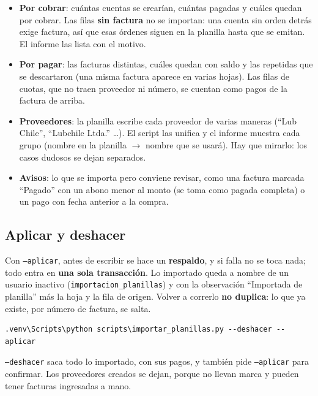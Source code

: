 \documentclass[11pt,a4paper]{article}
\begin{document}
\begin{itemize}
  \item \textbf{Por cobrar}: cuántas cuentas se crearían, cuántas pagadas y cuáles
        quedan por cobrar. Las filas \textbf{sin factura} no se importan: una
        cuenta sin orden detrás exige factura, así que esas órdenes siguen en la
        planilla hasta que se emitan. El informe las lista con el motivo.
  \item \textbf{Por pagar}: las facturas distintas, cuáles quedan con saldo y las
        repetidas que se descartaron (una misma factura aparece en varias hojas).
        Las filas de cuotas, que no traen proveedor ni número, se cuentan como
        pagos de la factura de arriba.
  \item \textbf{Proveedores}: la planilla escribe cada proveedor de varias maneras
        (``Lub Chile'', ``Lubchile Ltda.'' \ldots). El script las unifica y el
        informe muestra cada grupo (nombre en la planilla $\rightarrow$ nombre
        que se usará). Hay que mirarlo: los casos dudosos se dejan separados.
  \item \textbf{Avisos}: lo que se importa pero conviene revisar, como una factura
        marcada ``Pagado'' con un abono menor al monto (se toma como pagada
        completa) o un pago con fecha anterior a la compra.
\end{itemize}

\subsection{Aplicar y deshacer}

Con \texttt{--aplicar}, antes de escribir se hace un \textbf{respaldo}, y si falla
no se toca nada; todo entra en \textbf{una sola transacción}. Lo importado queda a
nombre de un usuario inactivo (\texttt{importacion\_planillas}) y con la
observación ``Importada de planilla'' más la hoja y la fila de origen. Volver a
correrlo \textbf{no duplica}: lo que ya existe, por número de factura, se salta.

\begin{lstlisting}
.venv\Scripts\python scripts\importar_planillas.py --deshacer --aplicar
\end{lstlisting}

\texttt{--deshacer} saca todo lo importado, con sus pagos, y también pide
\texttt{--aplicar} para confirmar. Los proveedores creados se dejan, porque no
llevan marca y pueden tener facturas ingresadas a mano.
\end{document}

